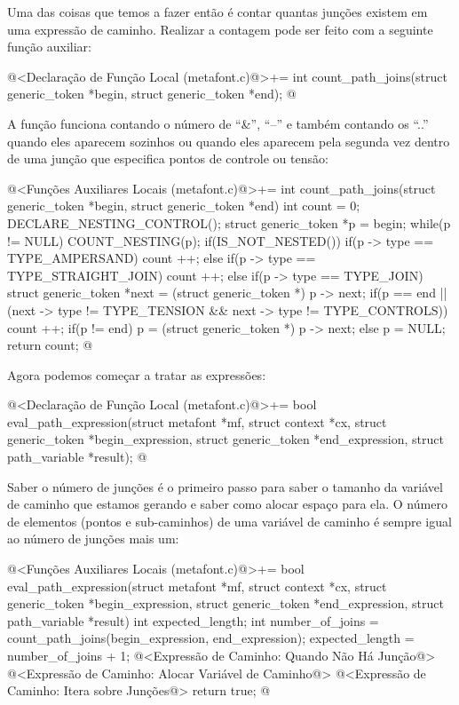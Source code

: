 Uma das coisas que temos a fazer então é contar quantas junções
existem em uma expressão de caminho. Realizar a contagem pode ser
feito com a seguinte função auxiliar:

\iniciocodigo
@<Declaração de Função Local (metafont.c)@>+=
int count_path_joins(struct generic_token *begin, struct generic_token *end);
@
\fimcodigo

A função funciona contando o número de ``\&'', ``--'' e também contando os
``..'' quando eles aparecem sozinhos ou quando eles aparecem pela
segunda vez dentro de uma junção que especifica pontos de controle ou
tensão:

\iniciocodigo
@<Funções Auxiliares Locais (metafont.c)@>+=
int count_path_joins(struct generic_token *begin, struct generic_token *end){
  int count = 0;
  DECLARE_NESTING_CONTROL();
  struct generic_token *p = begin;
  while(p != NULL){
    COUNT_NESTING(p);
    if(IS_NOT_NESTED()){
      if(p -> type == TYPE_AMPERSAND)
        count ++;
      else if(p -> type == TYPE_STRAIGHT_JOIN)
        count ++;
      else if(p -> type == TYPE_JOIN){
        struct generic_token *next = (struct generic_token *) p -> next;
        if(p == end || (next -> type !=  TYPE_TENSION &&
                        next -> type != TYPE_CONTROLS))
          count ++;
      }
    }
    if(p != end)
      p = (struct generic_token *) p -> next;
    else
      p = NULL;
  }
  return count;
}
@
\fimcodigo

Agora podemos começar a tratar as expressões:

\iniciocodigo
@<Declaração de Função Local (metafont.c)@>+=
bool eval_path_expression(struct metafont *mf, struct context *cx,
                          struct generic_token *begin_expression,
                          struct generic_token *end_expression,
                          struct path_variable *result);
@
\fimcodigo


Saber o número de junções é o primeiro passo para saber o tamanho da
variável de caminho que estamos gerando e saber como alocar espaço
para ela. O número de elementos (pontos e sub-caminhos) de uma
variável de caminho é sempre igual ao número de junções mais um:

\iniciocodigo
@<Funções Auxiliares Locais (metafont.c)@>+=
bool eval_path_expression(struct metafont *mf, struct context *cx,
                          struct generic_token *begin_expression,
                          struct generic_token *end_expression,
                          struct path_variable *result){
  int expected_length;
  int number_of_joins = count_path_joins(begin_expression, end_expression);
  expected_length = number_of_joins + 1;
  @<Expressão de Caminho: Quando Não Há Junção@>
  @<Expressão de Caminho: Alocar Variável de Caminho@>
  @<Expressão de Caminho: Itera sobre Junções@>
  return true;
}
@
\fimcodigo

